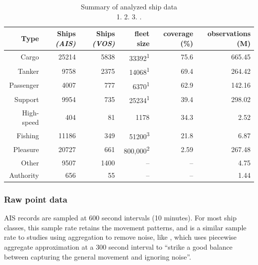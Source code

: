 \begin{table}[htbp]
  \begin{tabular}{rrrrrr} %
    \hline
    \small{Type} & \small{Ships \textit{(AIS)}} & \small{Ships \textit{(VOS)}} & \small{fleet size} & \small{coverage} (\%) & \small{observations} (M) \\
    \hline
    Cargo & 25214 & 5838 & 33392\textsuperscript{1} & 75.6 & 665.45 \\
    Tanker & 9758 & 2375 & 14068\textsuperscript{1} & 69.4 & 264.42 \\
    Passenger & 4007 & 777 & 6370\textsuperscript{1} & 62.9 & 142.16 \\
    Support & 9954 & 735 & 25234\textsuperscript{1} & 39.4 & 298.02 \\
    High-speed & 404 & 81 & 1178 & 34.3 & 2.52 \\
    Fishing & 11186 & 349 & 51200\textsuperscript{3} & 21.8 & 6.87 \\
    Pleasure & 20727 & 661 & 800,000\textsuperscript{2} & 2.59 & 267.48 \\
    Other & 9507 & 1400 & -- & -- & 4.75 \\
    Authority & 656 & 55 & -- & -- & 1.44 \\
  \end{tabular}
  \caption[Summary of analyzed ship data]{Summary of analyzed ship data\\
  1. \cite{Equasis2011} 2. \cite{westwood2001global} 3. \cite{FAOfishing}.}
  \label{table:ships-by-type}
\end{table}

\subsubsection{Raw point data}

AIS records are sampled at 600 second intervals (10 minutes). For most ship classes, this sample rate retains the movement patterns, and is a similar sample rate to studies using aggregation to remove noise, like \citep{Vries2009}, which uses piecewise aggregate approximation at a 300 second interval to ``strike a good balance between capturing the general movement and ignoring noise''. %


